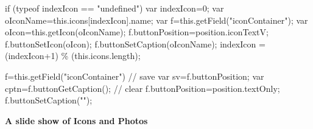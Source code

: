 \documentclass{article}
\begin{document}
\begin{defineJS}{\cycleJS}
if (typeof indexIcon == "undefined") var indexIcon=0;
var oIconName=this.icons[indexIcon].name;
var f=this.getField("iconContainer");
var oIcon=this.getIcon(oIconName);
f.buttonPosition=position.iconTextV;
f.buttonSetIcon(oIcon);
f.buttonSetCaption(oIconName);
indexIcon = (indexIcon+1) \% (this.icons.length);
\end{defineJS}
\begin{defineJS}{\clearJS}
f=this.getField("iconContainer")
// save
var sv=f.buttonPosition;
var cptn=f.buttonGetCaption();
// clear
f.buttonPosition=position.textOnly;
f.buttonSetCaption("");
\end{defineJS}

\begin{center}\Large\bfseries
A slide show of Icons and Photos
\end{center}

\begin{center}
\vcgBdry[6bp]
\cgBdry[3bp]
\end{center}
\end{document}
